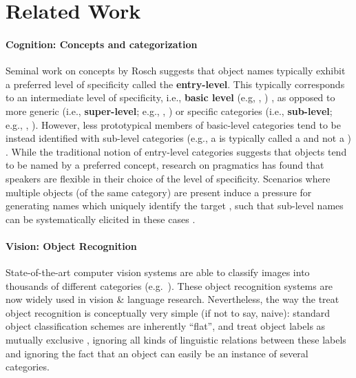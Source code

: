 \section{Related Work}
\label{sec:related}

\paragraph{Cognition: Concepts and categorization}

 Seminal work on concepts by Rosch suggests that object names typically exhibit a preferred level of specificity called the \textbf{entry-level}. This typically corresponds to an intermediate level of specificity, i.e., \textbf{basic level} (e.g, , ) \cite{rosch1976basic}, as opposed to more generic (i.e., \textbf{super-level}; e.g., , ) or specific categories (i.e., \textbf{sub-level}; e.g., , ). However, less prototypical members of basic-level categories tend to be instead identified with sub-level categories (e.g., a  is typically called a  and not a ) \cite{jolicoeur1984pictures}. 
While the traditional notion of entry-level categories suggests that objects tend to be named by a  preferred concept, research on pragmatics has found that speakers are flexible in  
their choice of the level of specificity. 
Scenarios where multiple objects (of the same category) are present induce a pressure for generating names which uniquely identify the target \cite{olson1970language}, such that sub-level names can be systematically elicited in these cases %
\cite{rohde2012communicating,graf2016animal}.

\paragraph{Vision: Object Recognition}

State-of-the-art computer vision systems are able to classify images into thousands of different categories (e.g.\  ). These object recognition systems are now widely used in vision \& language research.
Nevertheless, the way the treat object recognition is conceptually very simple (if not to say, naive):  standard object classification schemes are inherently ``flat'', and treat object labels as mutually exclusive \cite{deng2014large}, ignoring all kinds of linguistic relations between these labels and ignoring the fact that an object can easily be an instance of several categories.


